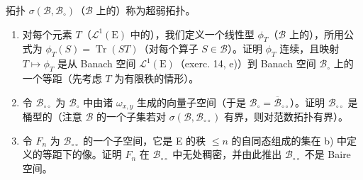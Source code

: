 拓扑 \(\sigma (\mathcal{B},\mathcal{B}_{\circ})\)（\(\mathcal{B}\) 上的）称为超弱拓扑。

\begin{enumerate}
\def\labelenumi{\alph{enumi})}
\setcounter{enumi}{1}
\item
  对每个元素 \(T\)（\(\mathcal{L}^1(\mathrm{E})\) 中的），我们定义一个线性型 \(\phi_T\)（\(\mathcal{B}\) 上的），所用公式为 \(\phi_T(S) = \operatorname{Tr}(ST)\)（对每个算子 \(S \in \mathcal{B}\)）。证明 \(\phi_T\) 连续，且映射 \(T \mapsto \phi_T\) 是从 Banach 空间 \(\mathcal{L}^1(\mathrm{E})\)（exerc. 14, e)）到 Banach 空间 \(\mathcal{B}_{\circ}\) 上的一个等距（先考虑 \(T\) 为有限秩的情形）。
\item
  令 \(\mathcal{B}_{\circ \circ}\) 为 \(\mathcal{B}_{\circ}\) 中由诸 \(\omega_{x,y}\) 生成的向量子空间（于是 \(\mathcal{B}_{\circ} = \overline{\mathcal{B}}_{\circ \circ} \)）。证明 \(\mathcal{B}_{\circ \circ}\) 是桶型的（注意 \(\mathcal{B}\) 的一个子集若对 \(\sigma (\mathcal{B},\mathcal{B}_{\circ \circ})\) 有界，则对范数拓扑有界）。
\item
  令 \(F_{n}\) 为 \(\mathcal{B}_{\circ \circ}\) 的一个子空间，它是 E 的秩 \(\leqslant n\) 的自同态组成的集在 b) 中定义的等距下的像。证明 \(F_{n}\) 在 \(\mathcal{B}_{\circ \circ}\) 中无处稠密，并由此推出 \(\mathcal{B}_{\circ \circ}\) 不是 Baire 空间。
\end{enumerate}

\backmatter
